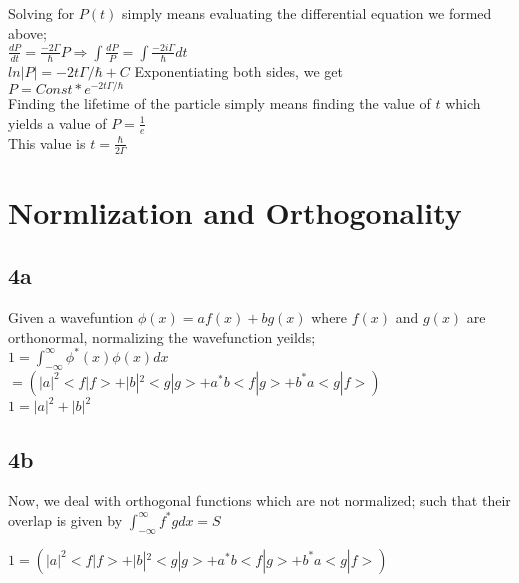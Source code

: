 \documentclass{article}
\begin{document}
Solving for $P(t)$ simply means evaluating the differential equation we formed above;\\

$\frac{dP}{dt}=\frac{-2\Gamma}{\hbar}P\Rightarrow {\displaystyle\int}\frac{dP}{P}={\displaystyle\int}\frac{-2i\Gamma}{\hbar}dt$\\

$ln|P|=-2t\Gamma/\hbar+C$ Exponentiating both sides, we get\\

$P=Const*e^{-2t\Gamma/\hbar}$\\

Finding the lifetime of the particle simply means finding the value of $t$ which yields a value of $P=\frac{1}{e}$\\
This value is $t=\frac{\hbar}{2\Gamma}$\\


\section*{Normlization and Orthogonality}
\subsection*{4a}
Given a wavefuntion $\phi(x)=af(x)+bg(x)$ where $f(x)$ and $g(x)$ are orthonormal, normalizing the wavefunction yeilds;\\



$1={\displaystyle \int_{-\infty}^\infty}\phi^*(x)\phi(x)dx$\\

$=(|a|^2<f|f>+|b|^2<g|g>+a^*b<f|g>+b^*a<g|f>)$\\

$1=|a|^2+|b|^2$\\

\subsection*{4b}

Now, we deal with orthogonal functions which are not normalized; such that their overlap is given by ${\displaystyle \int_{-\infty}^\infty}f^*gdx=S$

$1=(|a|^2<f|f>+|b|^2<g|g>+a^*b<f|g>+b^*a<g|f>)$\\
\end{document}
